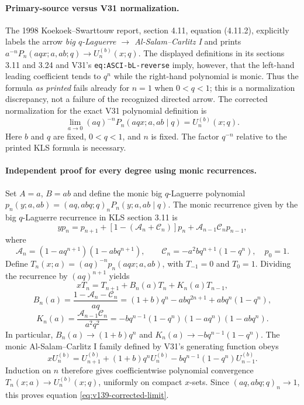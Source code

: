 \documentclass[11pt]{article}
\begin{document}
\paragraph{Primary-source versus V31 normalization.}
The 1998 Koekoek--Swarttouw report, section 4.11, equation (4.11.2), explicitly labels the arrow
\emph{big $q$-Laguerre $\longrightarrow$ Al-Salam--Carlitz I} and prints
$a^{-n}P_n(aqx;a,ab;q)\to U_n^{(b)}(x;q)$.
The displayed definitions in its sections 3.11 and 3.24 and V31's
\texttt{eq:ASCI-bL-reverse} imply, however, that the left-hand leading coefficient tends to $q^n$ while the right-hand polynomial is monic. Thus the formula \emph{as printed} fails already for $n=1$ when $0<q<1$; this is a normalization discrepancy, not a failure of the recognized directed arrow.
The corrected normalization for the exact V31 polynomial definition is
\begin{equation}\label{eq:v139-corrected-limit}
 \boxed{\lim_{a\to0}(aq)^{-n}P_n(aqx;a,ab\mid q)=U_n^{(b)}(x;q).}
\end{equation}
Here $b$ and $q$ are fixed, $0<q<1$, and $n$ is fixed. The factor $q^{-n}$ relative to the printed KLS formula is necessary.

\paragraph{Independent proof for every degree using monic recurrences.}
Set $A=a$, $B=ab$ and define the monic big $q$-Laguerre polynomial
$p_n(y;a,ab)=(aq,abq;q)_nP_n(y;a,ab\mid q)$.
The monic recurrence given by the big $q$-Laguerre recurrence in KLS section 3.11 is
\[
 y p_n=p_{n+1}+[1-(\mathcal A_n+\mathcal C_n)]p_n
       +\mathcal A_{n-1}\mathcal C_n p_{n-1},
\]
where
\[
 \mathcal A_n=(1-aq^{n+1})(1-abq^{n+1}),\qquad
 \mathcal C_n=-a^2bq^{n+1}(1-q^n),\quad p_0=1.
\]
Define $T_n(x;a)=(aq)^{-n}p_n(aqx;a,ab)$, with $T_{-1}=0$ and $T_0=1$.
Dividing the recurrence by $(aq)^{n+1}$ yields
\[
 xT_n=T_{n+1}+B_n(a)T_n+K_n(a)T_{n-1},
\]
\[
 B_n(a)=\frac{1-\mathcal A_n-\mathcal C_n}{aq}
 =(1+b)q^n-abq^{2n+1}+abq^n(1-q^n),
\]
\[
 K_n(a)=\frac{\mathcal A_{n-1}\mathcal C_n}{a^2q^2}
 =-bq^{n-1}(1-q^n)(1-aq^n)(1-abq^n).
\]
In particular, $B_n(a)\to(1+b)q^n$ and $K_n(a)\to-bq^{n-1}(1-q^n)$.
The monic Al-Salam--Carlitz I family defined by V31's generating function obeys
\[
 xU_n^{(b)}=U_{n+1}^{(b)}+(1+b)q^nU_n^{(b)}
                    -bq^{n-1}(1-q^n)U_{n-1}^{(b)}.
\]
Induction on $n$ therefore gives coefficientwise polynomial convergence
$T_n(x;a)\to U_n^{(b)}(x;q)$, uniformly on compact $x$-sets.
Since $(aq,abq;q)_n\to1$, this proves equation \eqref{eq:v139-corrected-limit}.
\end{document}
